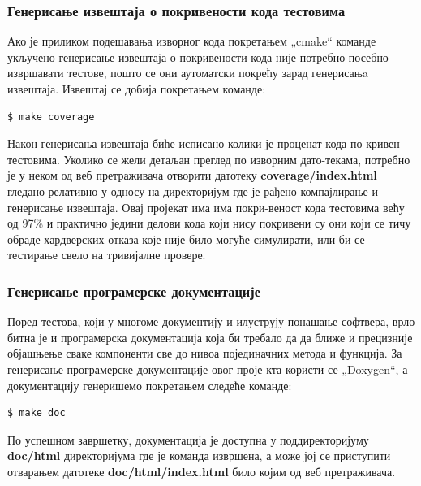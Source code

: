 \documentclass[a4paper, 12pt, diplomski]{etfcyr}
\def\quote#1{„#1“}
\begin{document}
				\subsubsection*{Генерисање извештаја о покривености кода тестовима}
					\begin{justify}
						Ако је приликом подешавања изворног кода покретањем \quote{cmake} команде укључено генерисање извештаја о покривености кода није потребно посебно извршавати тестове, пошто се они аутоматски покрећу зарад генерисањa извештаја. Извештај се добија покретањем команде:
						\begin{footnotesize}
							\begin{verbatim}
$ make coverage
							\end{verbatim}
						\end{footnotesize}
						Након генерисања извештаја биће исписано колики је проценат кода по-кривен тестовима. Уколико се жели детаљан преглед по изворним дато-текама, потребно је у неком од веб претраживача отворити датотеку \textbf{coverage/index.html} гледано релативно у односу на директоријум где је рађено компајлирање и генерисање извештаја. Овај пројекат има има покри-веност кода тестовима већу од 97\% и практично једини делови кода који нису покривени су они који се тичу обраде хардверских отказа које није било могуће симулирати, или би се тестирање свело на тривијалне провере.
					\end{justify}

				\subsubsection{Генерисање програмерске документације}
					\begin{justify}
						Поред тестова, који у многоме документију и илуструју понашање софтвера, врло битна је и програмерска документација која би требало да да ближе и прецизније објашњење сваке компоненти све до нивоа појединачних метода и функција. За генерисање програмерске документације овог проје-кта користи се \quote{Doxygen}, а документацију генеришемо покретањем следеће команде:
						\begin{footnotesize}
							\begin{verbatim}
$ make doc
							\end{verbatim}
						\end{footnotesize}
						По успешном завршетку, документација је доступна у поддиректоријуму \textbf{doc/html} директоријума где је команда извршена, а може јој се приступити отварањем датотеке \textbf{doc/html/index.html} било којим од веб претраживача.
					\end{justify}
\end{document}
